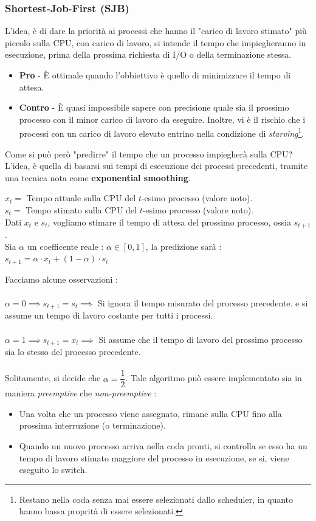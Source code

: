 \documentclass[12pt, letterpaper]{article}
\newcommand{\acc}{\\\hphantom{}\\}
\begin{document}
\subsubsection{Shortest-Job-First (SJB)}
L'idea, è di dare la priorità ai processi che hanno il 
"carico di lavoro stimato" più piccolo sulla CPU, con carico di lavoro, si 
intende il tempo che impiegheranno in esecuzione, prima della prossima 
richiesta di I/O o della terminazione stessa.\begin{itemize}
    \item \textbf{Pro} - È ottimale quando l'obbiettivo è quello di 
    minimizzare il tempo di attesa.
    \item \textbf{Contro} - È quasi impossibile sapere con precisione 
    quale sia il prossimo processo con il minor carico di lavoro da eseguire.
    Inoltre, vi è il rischio che i processi con un carico di lavoro 
    elevato entrino nella condizione di \textit{starving}\footnote{
        Restano nella coda senza mai essere selezionati dallo scheduler, 
        in quanto hanno bassa proprità di essere selezionati.
    }.
\end{itemize}
Come si può però "predirre" il tempo che un processo impiegherà sulla 
CPU? L'idea, è quella di basarsi sui tempi di esecuzione dei processi 
precedenti, tramite una tecnica nota come \textbf{exponential smoothing}.\begin{center}
    \(x_t=\) Tempo attuale sulla CPU del \(t\)-esimo processo (valore noto). 
    \\\(s_t=\)  Tempo stimato sulla CPU del \(t\)-esimo processo (valore noto).
    \\Dati \(x_t\) e \(s_t\), vogliamo stimare il tempo di attesa del prossimo processo, 
    ossia \(s_{t+1}\). \\
    Sia \(\alpha\) un coefficente reale : \(\alpha\in [0,1]\), la predizione sarà :\\
\(s_{t+1}=\alpha\cdot x_t+(1-\alpha)\cdot s_t\)
\end{center}
Facciamo alcune osservazioni :\acc
    \(\alpha=0\implies s_{t+1}=s_t\implies\) Si ignora il tempo misurato del processo 
    precedente. e si assume un tempo di lavoro costante per tutti i processi.\acc 
    \(\alpha=1\implies s_{t+1}=x_t\implies\) Si assume che il tempo di lavoro 
    del prossimo processo sia lo stesso del processo precedente.\acc 
Solitamente, si decide che \(\alpha=\dfrac{1}{2}\). Tale algoritmo può essere implementato 
sia in maniera \textit{preemptive} che \textit{non-preemptive} : \begin{itemize}
    \item Una volta che un processo viene assegnato, rimane sulla CPU fino alla prossima 
    interruzione (o terminazione).
    \item Quando un nuovo processo arriva nella coda pronti, si controlla se 
    esso ha un tempo di lavoro stimato maggiore del processo in esecuzione, se si, 
    viene eseguito lo switch.
\end{itemize}
\end{document}
